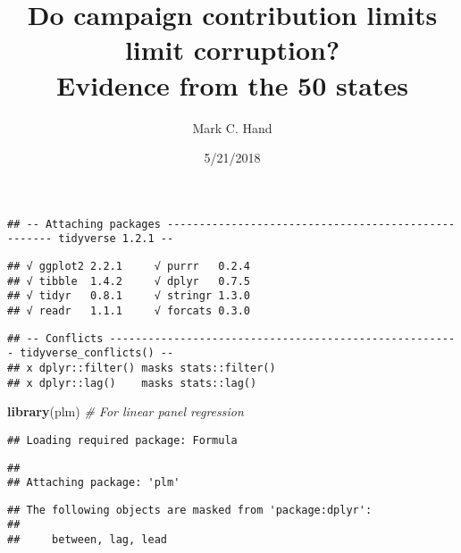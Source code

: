 \documentclass[]{article}
\title{Do campaign contribution limits limit corruption?\\
Evidence from the 50 states}
\author{Mark C. Hand}
\date{5/21/2018}
\newenvironment{Shaded}{\begin{snugshade}}{\end{snugshade}}
\newcommand{\KeywordTok}[1]{\textcolor[rgb]{0.13,0.29,0.53}{\textbf{#1}}}
\newcommand{\DataTypeTok}[1]{\textcolor[rgb]{0.13,0.29,0.53}{#1}}
\newcommand{\CommentTok}[1]{\textcolor[rgb]{0.56,0.35,0.01}{\textit{#1}}}
\newcommand{\OtherTok}[1]{\textcolor[rgb]{0.56,0.35,0.01}{#1}}
\newcommand{\OperatorTok}[1]{\textcolor[rgb]{0.81,0.36,0.00}{\textbf{#1}}}
\newcommand{\NormalTok}[1]{#1}
\begin{document}
\maketitle

\begin{Shaded}
\end{Shaded}

\begin{verbatim}
## -- Attaching packages ---------------------------------------------------- tidyverse 1.2.1 --
\end{verbatim}

\begin{verbatim}
## √ ggplot2 2.2.1     √ purrr   0.2.4
## √ tibble  1.4.2     √ dplyr   0.7.5
## √ tidyr   0.8.1     √ stringr 1.3.0
## √ readr   1.1.1     √ forcats 0.3.0
\end{verbatim}

\begin{verbatim}
## -- Conflicts ------------------------------------------------------- tidyverse_conflicts() --
## x dplyr::filter() masks stats::filter()
## x dplyr::lag()    masks stats::lag()
\end{verbatim}

\begin{Shaded}
\begin{Highlighting}[]
\KeywordTok{library}\NormalTok{(plm) }\CommentTok{# For linear panel regression}
\end{Highlighting}
\end{Shaded}

\begin{verbatim}
## Loading required package: Formula
\end{verbatim}

\begin{verbatim}
## 
## Attaching package: 'plm'
\end{verbatim}

\begin{verbatim}
## The following objects are masked from 'package:dplyr':
## 
##     between, lag, lead
\end{verbatim}
\end{document}
